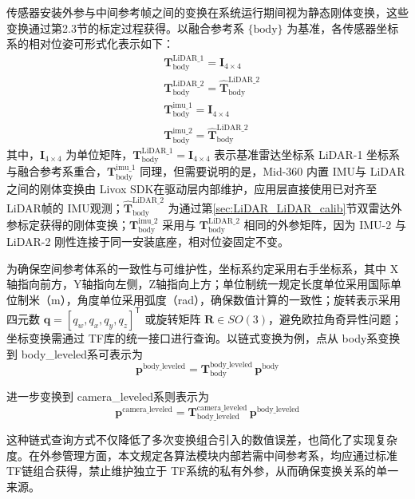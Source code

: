 传感器安装外参与中间参考帧之间的变换在系统运行期间视为静态刚体变换，这些变换通过第2.3节的标定过程获得。以融合参考系 $\{\text{body}\}$ 为基准，各传感器坐标系的相对位姿可形式化表示如下：
\begin{align}
& \mathbf{T}_{\text{body}}^{\text{LiDAR\_1}} = \mathbf{I}_{4\times 4} \\[5pt]
& \mathbf{T}_{\text{body}}^{\text{LiDAR\_2}} = \hat{\mathbf{T}}_{\text{body}}^{\text{LiDAR\_2}} \\[5pt]
& \mathbf{T}_{\text{body}}^{\text{imu\_1}} = \mathbf{I}_{4\times 4} \\[5pt]
& \mathbf{T}_{\text{body}}^{\text{imu\_2}} = \hat{\mathbf{T}}_{\text{body}}^{\text{LiDAR\_2}}
\end{align}
其中，$\mathbf{I}_{4\times 4}$ 为单位矩阵，$\mathbf{T}_{\text{body}}^{\text{LiDAR\_1}} = \mathbf{I}_{4\times 4}$ 表示基准雷达坐标系 LiDAR-1 坐标系与融合参考系重合，$\mathbf{T}_{\text{body}}^{\text{imu\_1}}$ 同理，但需要说明的是，Mid-360 内置 IMU与 LiDAR之间的刚体变换由 Livox SDK在驱动层内部维护，应用层直接使用已对齐至 LiDAR帧的 IMU观测；$\hat{\mathbf{T}}_{\text{body}}^{\text{LiDAR\_2}}$ 为通过第\ref{sec:LiDAR_LiDAR_calib}节双雷达外参标定获得的刚体变换；$\mathbf{T}_{\text{body}}^{\text{imu\_2}}$ 采用与 $\mathbf{T}_{\text{body}}^{\text{LiDAR\_2}}$ 相同的外参矩阵，因为 IMU-2 与 LiDAR-2 刚性连接于同一安装底座，相对位姿固定不变。

为确保空间参考体系的一致性与可维护性，坐标系约定采用右手坐标系，其中 X轴指向前方，Y轴指向左侧，Z轴指向上方；单位制统一规定长度单位采用国际单位制米（m），角度单位采用弧度（rad），确保数值计算的一致性；旋转表示采用四元数 $\mathbf{q}=[q_w, q_x, q_y, q_z]^{\mathsf{T}}$ 或旋转矩阵 $\mathbf{R}\in SO(3)$，避免欧拉角奇异性问题；坐标变换需通过 TF库的统一接口进行查询。以链式变换为例，点从 body系变换到 body\_leveled系可表示为
\begin{equation}
\mathbf{p}^{\text{body\_leveled}} = \mathbf{T}_{\text{body}}^{\text{body\_leveled}}\,\mathbf{p}^{\text{body}}
\end{equation}

进一步变换到 camera\_leveled系则表示为
\begin{equation}
\mathbf{p}^{\text{camera\_leveled}} = \mathbf{T}_{\text{body\_leveled}}^{\text{camera\_leveled}}\,\mathbf{p}^{\text{body\_leveled}}
\end{equation}

这种链式查询方式不仅降低了多次变换组合引入的数值误差，也简化了实现复杂度。在外参管理方面，本文规定各算法模块内部若需中间参考系，均应通过标准 TF链组合获得，禁止维护独立于 TF系统的私有外参，从而确保变换关系的单一来源。

